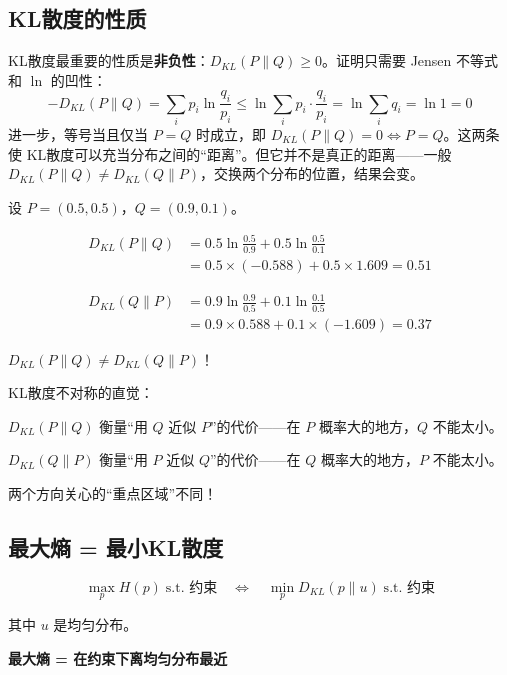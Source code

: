 \subsection{KL散度的性质}

KL散度最重要的性质是\textbf{非负性}：$D_{KL}(P \| Q) \geq 0$。证明只需要 Jensen 不等式和 $\ln$ 的凹性：
\[
-D_{KL}(P \| Q) = \sum_i p_i \ln \frac{q_i}{p_i} \leq \ln \sum_i p_i \cdot \frac{q_i}{p_i} = \ln \sum_i q_i = \ln 1 = 0
\]
进一步，等号当且仅当 $P = Q$ 时成立，即 $D_{KL}(P \| Q) = 0 \Leftrightarrow P = Q$。这两条使 KL散度可以充当分布之间的“距离”。但它并不是真正的距离——一般 $D_{KL}(P \| Q) \neq D_{KL}(Q \| P)$，交换两个分布的位置，结果会变。

\begin{example}[不对称性的例子]
设 $P = (0.5, 0.5)$，$Q = (0.9, 0.1)$。

\begin{align}
D_{KL}(P \| Q) &= 0.5 \ln \frac{0.5}{0.9} + 0.5 \ln \frac{0.5}{0.1} \\
&= 0.5 \times (-0.588) + 0.5 \times 1.609 = 0.51
\end{align}

\begin{align}
D_{KL}(Q \| P) &= 0.9 \ln \frac{0.9}{0.5} + 0.1 \ln \frac{0.1}{0.5} \\
&= 0.9 \times 0.588 + 0.1 \times (-1.609) = 0.37
\end{align}

$D_{KL}(P \| Q) \neq D_{KL}(Q \| P)$！
\end{example}

\begin{insightbox}
KL散度不对称的直觉：

$D_{KL}(P \| Q)$ 衡量“用 $Q$ 近似 $P$”的代价——在 $P$ 概率大的地方，$Q$ 不能太小。

$D_{KL}(Q \| P)$ 衡量“用 $P$ 近似 $Q$”的代价——在 $Q$ 概率大的地方，$P$ 不能太小。

两个方向关心的“重点区域”不同！
\end{insightbox}

\subsection{最大熵 = 最小KL散度}

\begin{unification}[title=最大熵的等价形式]
\begin{equation}
\max_p H(p) \;\text{s.t. 约束} \quad \Longleftrightarrow \quad \min_p D_{KL}(p \| u) \;\text{s.t. 约束}
\end{equation}

其中 $u$ 是均匀分布。

\textbf{最大熵 = 在约束下离均匀分布最近}
\end{unification}

